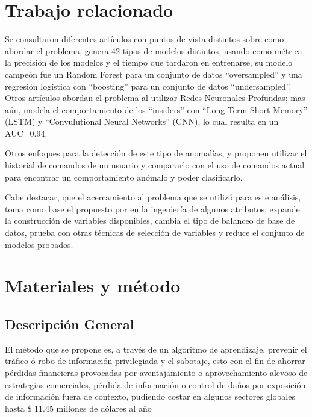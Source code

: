 \documentclass[runningheads]{llncs}
\begin{document}
\section{Trabajo relacionado}
\label{sec:trabajo-relacionado}

Se consultaron diferentes artículos con puntos de vista distintos sobre como abordar el problema, \cite{noever2019classifier} genera 42 tipos de modelos distintos, usando como métrica la precisión de los modelos y el tiempo que tardaron en entrenarse, su modelo campeón fue un Random Forest para un conjunto de datos ``oversampled'' y una regresión logística con ``boosting'' para un conjunto de datos ``undersampled''. Otros artículos \cite{yuan2018insider} abordan el problema al utilizar Redes Neuronales Profundas; mas aún, modela el comportamiento de los ``insiders'' con ``Long Term Short Memory'' (LSTM) y ``Convulutional Neural Networks'' (CNN), lo cual resulta en un AUC=0.94.  

Otros enfoques para la detección de este tipo de anomalías, \cite{davison1998predicting} y \cite{lane1997sequence} proponen utilizar el historial de comandos de un usuario y compararlo con el uso de comandos actual para encontrar un comportamiento anómalo y poder clasificarlo.

Cabe destacar, que el acercamiento al problema que se utilizó para este análisis, toma como base el propuesto por \cite{noever2019classifier} en la ingeniería de algunos atributos, expande la construcción de variables disponibles, cambia el tipo de balanceo de base de datos, prueba con otras técnicas de selección de variables y reduce el conjunto de modelos probados.

\section{Materiales y método}
\label{sec:materiales-metodo}

\subsection{Descripción General}    
\label{sec:descripcion-general}
El método que se propone es, a través de un algoritmo de aprendizaje, prevenir el tráfico ó robo de información privilegiada y el sabotaje, esto con el fin de ahorrar pérdidas financieras provocadas por aventajamiento o aprovechamiento alevoso de estrategias comerciales, pérdida de información o control de daños por exposición de información fuera de contexto, pudiendo costar en algunos sectores globales hasta \$ 11.45 millones de dólares al año \cite{insidercost}
\end{document}
